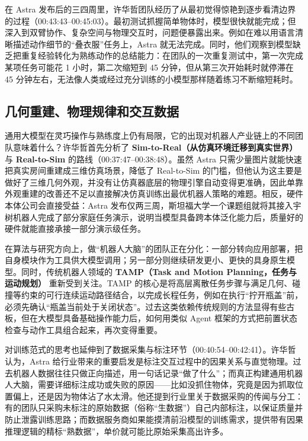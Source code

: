 \documentclass[UTF8,a4paper,11pt,fontset=fandol]{ctexart}
\begin{document}
在 Astra 发布后的三四周里，许华哲团队经历了从最初觉得惊艳到逐步看清边界的过程（00:43:43–00:45:03）。最初测试抓握简单物体时，模型很快就能完成；但深入到双臂协作、复杂空间与物理交互时，问题便暴露出来。例如在难以用语言清晰描述动作细节的“叠衣服”任务上，Astra 就无法完成。同时，他们观察到模型缺乏把重复经验转化为熟练动作的总结能力：在团队的一次重复测试中，第一次完成某项任务可能花 1 小时，第二次缩短到 45 分钟，但从第三次开始耗时就停滞在 45 分钟左右，无法像人类或经过充分训练的小模型那样随着练习不断缩短耗时。

\subsection{几何重建、物理规律和交互数据}
通用大模型在灵巧操作与熟练度上仍有局限，它的出现对机器人产业链上的不同团队意味着什么？许华哲首先分析了 \textbf{Sim-to-Real（从仿真环境迁移到真实世界）} 与 \textbf{Real-to-Sim} 的路线（00:37:47–00:38:48）。虽然 Astra 只需少量图片就能快速把真实房间重建成三维仿真场景，降低了 Real-to-Sim 的门槛，但他认为这主要是做好了三维几何外观，并没有让仿真器底层的物理引擎自动变得更准确，因此单靠外观重建的改善还不足以直接解决仿真训练出最优机器人策略的难题。相反，硬件本体公司会直接受益：Astra 发布仅两三周，斯坦福大学一个课题组就将其接入宇树机器人完成了部分家庭任务演示，说明当模型具备跨本体泛化能力后，质量好的硬件就能直接承接一部分演示级任务。

在算法与研究方向上，做“机器人大脑”的团队正在分化：一部分转向应用部署，把自身模块作为工具供大模型调用；另一部分则继续研发更小、更快的具身原生模型。同时，传统机器人领域的 \textbf{TAMP（Task and Motion Planning，任务与运动规划）} 重新受到关注。TAMP 的核心是将高层离散任务步骤与满足几何、碰撞等约束的可行连续运动路径结合，以完成长程任务，例如在执行“拧开瓶盖”前，必须先确认“瓶盖当前处于关闭状态”。过去这类依赖传统规则的方法显得有些古板，但在大模型具备基础操作能力后，如何用类似 Agent 框架的方式把前置状态检查与动作工具组合起来，再次变得重要。

对训练范式的思考也延伸到了数据采集与标注环节（00:40:54–00:42:41）。许华哲认为，Astra 给行业带来的重要启发是标注交互过程中的因果关系与直觉物理。过去机器人数据往往只做正向描述，用一句话记录“做了什么”；而真正构建通用机器人大脑，需要详细标注成功或失败的原因——比如没抓住物体，究竟是因为抓取位置偏上，还是因为物体沾了水太滑。他还提到行业里关于数据采购的传闻与分工：有的团队只采购未标注的原始数据（俗称“生数据”）自己内部标注，以保证质量并防止泄露训练思路；而数据服务商如果能摸清前沿模型的训练需求，提供带有因果推理逻辑的精标“熟数据”，单价就可能比原始采集高出许多。
\end{document}
